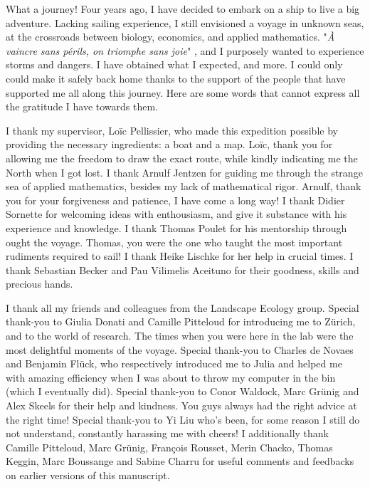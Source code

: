%
\label{sec:acknowledgement}


What a journey!
% 
Four years ago, I have decided to embark on a ship to live a big adventure.
% 
Lacking sailing experience, I still envisioned a voyage in unknown seas, at the crossroads between biology, economics, and applied mathematics.
% 
"\textit{À vaincre sans périls, on triomphe sans joie}" \citep{maufrais1997aventures}, and I purposely wanted to experience storms and dangers.
% 
I have obtained what I expected, and more.
% 
I could only could make it safely back home thanks to the support of the people that have supported me all along this journey. Here are some words that cannot express all the gratitude I have towards them.

I thank my supervisor, Loïc Pellissier, who made this expedition possible by providing the necessary ingredients: a boat and a map. Loïc, thank you for allowing me the freedom to draw the exact route, while kindly indicating me the North when I got lost.
% 
I thank Arnulf Jentzen for guiding me through the strange sea of applied mathematics, besides my lack of mathematical rigor. Arnulf, thank you for your forgiveness and patience, I have come a long way!
% 
I thank Didier Sornette for welcoming ideas with enthousiasm, and give it substance with his experience and knowledge.
% 
I thank Thomas Poulet for his mentorship through ought the voyage. Thomas, you were the one who taught the most important rudiments required to sail! 
% 
I thank Heike Lischke for her help in crucial times.
% 
I thank Sebastian Becker and Pau Vilimelis Aceituno for their goodness, skills and precious hands.
% 

% 
I thank all my friends and colleagues from the Landscape Ecology group. Special thank-you to Giulia Donati and Camille Pitteloud for introducing me to Zürich, and to the world of research. The times when you were here in the lab were the most delightful moments of the voyage.
% 
Special thank-you to Charles de Novaes and Benjamin Flück, who respectively introduced me to Julia and helped me with amazing efficiency when I was about to throw my computer in the bin (which I eventually did).
% 
Special thank-you to Conor Waldock, Marc Grünig and Alex Skeels for their help and kindness. You guys always had the right advice at the right time!
% 
Special thank-you to Yi Liu who's been, for some reason I still do not understand, constantly harassing me with cheers!
% 
I additionally thank Camille Pitteloud, Marc Grünig, François Rousset, Merin Chacko, Thomas Keggin, Marc Boussange and Sabine Charru for useful comments and feedbacks on earlier versions of this manuscript.

